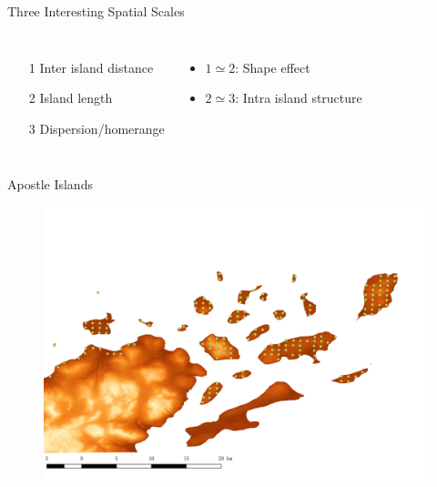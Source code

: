 \documentclass{beamer}
\begin{document}
\begin{frame}{Three Interesting Spatial Scales}
\begin{columns}
	\column{5cm}
	\begin{itemize}
		\item[1] Inter island distance
		\item[2] Island length 
		\item[3] Dispersion/homerange
	\end{itemize}
	\column{5cm}
	\begin{itemize}
		\item $1\simeq2$: Shape effect
		\item $2\simeq3$: Intra island structure
	\end{itemize}
\end{columns}
\end{frame}

\begin{frame}{Apostle Islands} %
	\begin{figure}[ht]
		\centering
		\includegraphics[scale=.3]{fig/APIS/APIS_camera.png}
		\label{beta-size}
	\end{figure}
\end{frame}
\end{document}
